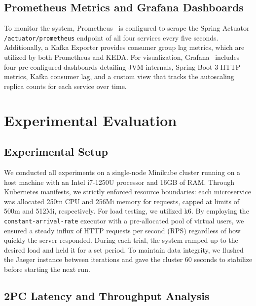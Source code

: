 \documentclass[]{USG}
\begin{document}
\subsection{Prometheus Metrics and Grafana Dashboards}
\label{subsec:prometheus}

To monitor the system, Prometheus~\cite{prometheus2015} is configured to scrape the Spring Actuator
\texttt{/actuator/prometheus} endpoint of all four services every five seconds.
%
Additionally, a Kafka Exporter provides consumer group lag metrics, which are
utilized by both Prometheus and KEDA.
%
For visualization, Grafana~\cite{grafana2024} includes four pre-configured dashboards detailing JVM
internals, Spring Boot 3 HTTP metrics, Kafka consumer lag, and a custom view
that tracks the autoscaling replica counts for each service over time.


\section{Experimental Evaluation}
\label{sec:evaluation}

\subsection{Experimental Setup}
\label{subsec:setup}
We conducted all experiments on a single-node Minikube cluster running on a 
host machine with an Intel i7-1250U processor and 16GB of RAM.
%
Through Kubernetes manifests, we strictly enforced resource boundaries: each 
microservice was allocated 250m CPU and 256Mi memory for requests, capped at 
limits of 500m and 512Mi, respectively.
%
For load testing, we utilized k6.
%
By employing the \texttt{constant-arrival-rate} executor with a pre-allocated 
pool of virtual users, we ensured a steady influx of HTTP requests per second (RPS) 
regardless of how quickly the server responded.
%
During each trial, the system ramped up to the desired load and held it for a set period.
%
To maintain data integrity, we flushed the Jaeger instance between iterations 
and gave the cluster 60 seconds to stabilize before starting the next run.

\subsection{2PC Latency and Throughput Analysis}
\label{subsec:latency-results}
\end{document}
